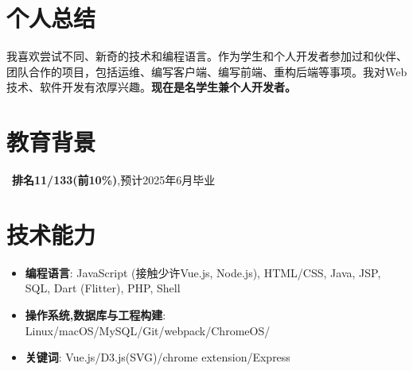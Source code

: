 \documentclass{resume}
\begin{document}


\section{个人总结}
我喜欢尝试不同、新奇的技术和编程语言。作为学生和个人开发者参加过和伙伴、团队合作的项目，包括运维、编写客户端、编写前端、重构后端等事项。我对Web技术、软件开发有浓厚兴趣。\textbf{现在是名学生兼个人开发者。}

\section{教育背景}
\ \textbf{排名11/133(前10\%)},预计2025年6月毕业

\section{技术能力}
\begin{itemize}[parsep=0.2ex]
  \item \textbf{编程语言}: JavaScript (接触少许Vue.js, Node.js), HTML/CSS, Java, JSP, SQL, Dart (Flitter), PHP, Shell
  \item \textbf{操作系统,数据库与工程构建}: Linux/macOS/MySQL/Git/webpack/ChromeOS/
  \item \textbf{关键词}: Vue.js/D3.js(SVG)/chrome extension/Express
\end{itemize}

\end{document}
